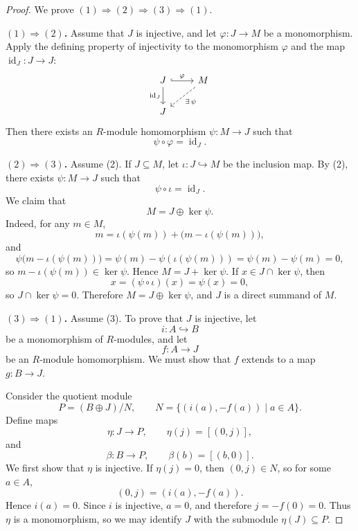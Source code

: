 \begin{proof}
    We prove $(1)\Rightarrow(2)\Rightarrow(3)\Rightarrow(1)$.

    \medskip
    \noindent\textbf{$(1)\Rightarrow(2)$.}
    Assume that $J$ is injective, and let $\varphi\colon J\to M$ be a monomorphism.
    Apply the defining property of injectivity to the monomorphism $\varphi$ and the map $\operatorname{id}_J\colon J\to J$:
    \[
        \begin{tikzcd}
            J \arrow[r, hook, "\varphi"] \arrow[d, "\operatorname{id}_J"'] & M \arrow[dl, dashed, "\exists\,\psi"] \\
            J &
        \end{tikzcd}
    \]
    Then there exists an $R$-module homomorphism $\psi\colon M\to J$ such that
    \[
        \psi\circ\varphi=\operatorname{id}_J.
    \]

    \medskip
    \noindent\textbf{$(2)\Rightarrow(3)$.}
    Assume \textup{(2)}.
    If $J\subseteq M$, let $\iota\colon J\hookrightarrow M$ be the inclusion map.
    By \textup{(2)}, there exists $\psi\colon M\to J$ such that
    \[
        \psi\circ\iota=\operatorname{id}_J.
    \]
    We claim that
    \[
        M=J\oplus\ker\psi.
    \]
    Indeed, for any $m\in M$,
    \[
        m=\iota(\psi(m))+\bigl(m-\iota(\psi(m))\bigr),
    \]
    and
    \[
        \psi\bigl(m-\iota(\psi(m))\bigr)=\psi(m)-\psi(\iota(\psi(m)))=\psi(m)-\psi(m)=0,
    \]
    so $m-\iota(\psi(m))\in\ker\psi$.
    Hence $M=J+\ker\psi$.
    If $x\in J\cap\ker\psi$, then
    \[
        x=(\psi\circ\iota)(x)=\psi(x)=0,
    \]
    so $J\cap\ker\psi=0$.
    Therefore $M=J\oplus\ker\psi$, and $J$ is a direct summand of $M$.

    \medskip
    \noindent\textbf{$(3)\Rightarrow(1)$.}
    Assume \textup{(3)}.
    To prove that $J$ is injective, let
    \[
        i\colon A\hookrightarrow B
    \]
    be a monomorphism of $R$-modules, and let
    \[
        f\colon A\to J
    \]
    be an $R$-module homomorphism.
    We must show that $f$ extends to a map $g\colon B\to J$.

    Consider the quotient module
    \[
        P=(B\oplus J)/N,
        \qquad
        N=\{(i(a),-f(a))\mid a\in A\}.
    \]
    Define maps
    \[
        \eta\colon J\to P,\qquad \eta(j)=[(0,j)],
    \]
    and
    \[
        \beta\colon B\to P,\qquad \beta(b)=[(b,0)].
    \]
    We first show that $\eta$ is injective.
    If $\eta(j)=0$, then $(0,j)\in N$, so for some $a\in A$,
    \[
        (0,j)=(i(a),-f(a)).
    \]
    Hence $i(a)=0$. Since $i$ is injective, $a=0$, and therefore $j=-f(0)=0$.
    Thus $\eta$ is a monomorphism, so we may identify $J$ with the submodule $\eta(J)\subseteq P$.


\end{proof}
